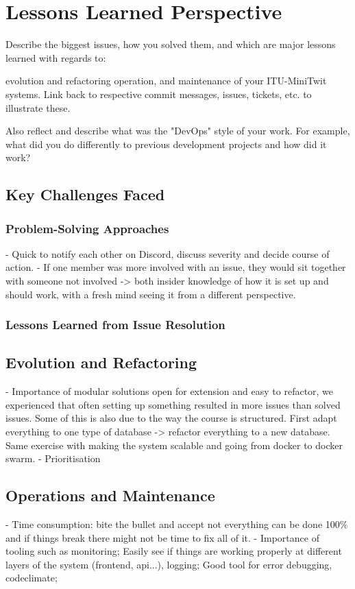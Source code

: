 \section{Lessons Learned Perspective}
Describe the biggest issues, how you solved them, and which are major lessons learned with regards to:

evolution and refactoring
operation, and
maintenance
of your ITU-MiniTwit systems. Link back to respective commit messages, issues, tickets, etc. to illustrate these.

Also reflect and describe what was the "DevOps" style of your work. For example, what did you do differently to previous development projects and how did it work?


\subsection{Key Challenges Faced}
\subsubsection*{Problem-Solving Approaches}
- Quick to notify each other on Discord, discuss severity and decide course of action. 
- If one member was more involved with an issue, they would sit together with someone not involved -> both insider knowledge of how it is set up and should work, with a fresh mind seeing it from a different perspective.

\subsubsection*{Lessons Learned from Issue Resolution}
\subsection{Evolution and Refactoring}
- Importance of modular solutions open for extension and easy to refactor, we experienced that often setting up something resulted in more issues than solved issues. Some of this is also due to the way the course is structured. First adapt everything to one type of database -> refactor everything to a new database. Same exercise with making the system scalable and going from docker to docker swarm.
- Prioritisation
\subsection{Operations and Maintenance}
- Time consumption: bite the bullet and accept not everything can be done 100\% and if things break there might not be time to fix all of it.
- Importance of tooling such as monitoring; Easily see if things are working properly at different layers of the system (frontend, api...), logging; Good tool for error debugging, codeclimate; 

